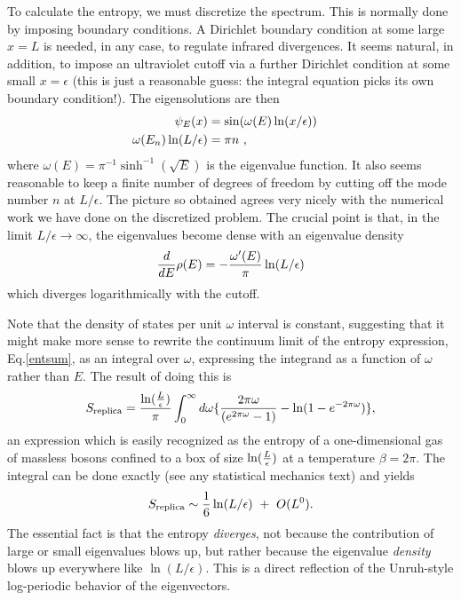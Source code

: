 \documentclass[12pt]{article}
\begin{document}
To calculate the entropy, we must discretize the spectrum. This is normally
done by imposing boundary conditions. A Dirichlet
boundary condition at some large $x=L$ is needed, in any case, to regulate
infrared divergences. It seems natural, in addition, to impose
an ultraviolet cutoff via a further Dirichlet condition at
some small $x=\epsilon$ (this is just a reasonable guess: the integral
equation picks its own boundary condition!). The eigensolutions are then
\begin{align}
\psi_E(x) &= \sin(\omega(E) \ln(x/\epsilon))\cr
\omega(E_n)\ln(L/\epsilon) &= \pi n ~,
\end{align}
where $\omega(E)=\pi^{-1}\sinh^{-1}(\sqrt{E})$ is the eigenvalue
function. It also seems reasonable to keep a finite number of degrees of
freedom by cutting off the mode number $n$ at $L/\epsilon$. The picture so
obtained agrees very nicely with the numerical work we have done on the
discretized problem. The crucial point is that, in the limit
$L/\epsilon\to\infty$, the eigenvalues become dense with an eigenvalue density
\begin{equation}
{d\over dE} \rho(E) =
    -{\omega^\prime(E)\over\pi}\ln(L/\epsilon)
\end{equation}
which diverges logarithmically with the cutoff.

Note that the density of
states per unit $\omega$ interval is constant, suggesting that it might
make more sense to rewrite the continuum limit of the entropy expression,
Eq.\ref{entsum}, as an integral over $\omega$, expressing the integrand as
a function of $\omega$ rather than $E$. The result of doing this is
\begin{equation}
S_{{\rm replica}} = {\ln({L\over\epsilon})\over\pi}\int_0^\infty d\omega
\{
{2\pi\omega\over(e^{2\pi\omega}-1)}-\ln(1-e^{-2\pi\omega})\},
\label{rindent}
\end{equation}
an expression which is easily recognized as the entropy of a one-dimensional
gas of massless bosons
confined to a box of size $\ln({L\over\epsilon})$ at a temperature
$\beta=2\pi$.
The integral can be done exactly (see any statistical mechanics text) and
yields
\begin{equation}
	S_{\rm replica}\sim {1\over 6} \ln(L/\epsilon)~+~O(L^0).
\end{equation}
The essential fact is that the entropy {\it diverges}, not because the
contribution of large or small eigenvalues blows up, but rather because the
eigenvalue {\it density} blows up everywhere like $\ln(L/\epsilon)$. This
is a direct reflection of the Unruh-style log-periodic behavior of the
eigenvectors.
\end{document}
